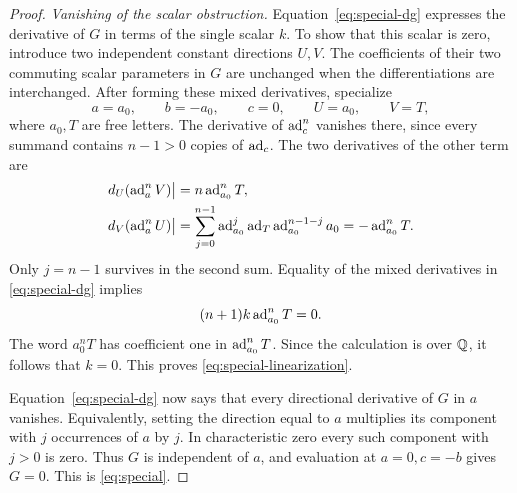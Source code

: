 \begin{proof}
\emph{Vanishing of the scalar obstruction.}
Equation~\eqref{eq:special-dg} expresses the derivative of \(G\) in
terms of the single scalar \(k\).  To show that this scalar is zero,
introduce two independent constant directions \(U,V\).  The
coefficients of their two commuting scalar parameters in \(G\)
are unchanged when the differentiations are interchanged.  After
forming these mixed derivatives, specialize
\[
 a=a_0,\qquad b=-a_0,\qquad c=0,\qquad U=a_0,\qquad V=T,
\]
where \(a_0,T\) are free letters.  The derivative of \(\operatorname{ad}_c^n\)
vanishes there, since every summand contains \(n-1>0\) copies of
\(\operatorname{ad}_c\).  The two derivatives of the other term are
\begin{align*}
 d_U(\operatorname{ad}_a^nV)\big|&=n\operatorname{ad}_{a_0}^nT,\\
 d_V(\operatorname{ad}_a^nU)\big|
   &=\sum_{j=0}^{n-1}
       \operatorname{ad}_{a_0}^{j}\operatorname{ad}_T\operatorname{ad}_{a_0}^{n-1-j}a_0
     =-\operatorname{ad}_{a_0}^{n}T.
\end{align*}
Only \(j=n-1\) survives in the second sum.  Equality of the mixed
derivatives in \eqref{eq:special-dg} implies
\[
 (n+1)k\operatorname{ad}_{a_0}^{n}T=0.
\]
The word \(a_0^nT\) has coefficient one in
\(\operatorname{ad}_{a_0}^{n}T\).  Since the calculation is over \(\mathbb Q\), it
follows that \(k=0\).  This proves
\eqref{eq:special-linearization}.

Equation~\eqref{eq:special-dg} now says that every directional
derivative of \(G\) in \(a\) vanishes.  Equivalently, setting the
direction equal to \(a\) multiplies its component with \(j\)
occurrences of \(a\) by \(j\).  In characteristic zero every such
component with \(j>0\) is zero.  Thus \(G\) is independent of
\(a\), and evaluation at \(a=0,c=-b\) gives \(G=0\).  This is
\eqref{eq:special}.
\end{proof}

